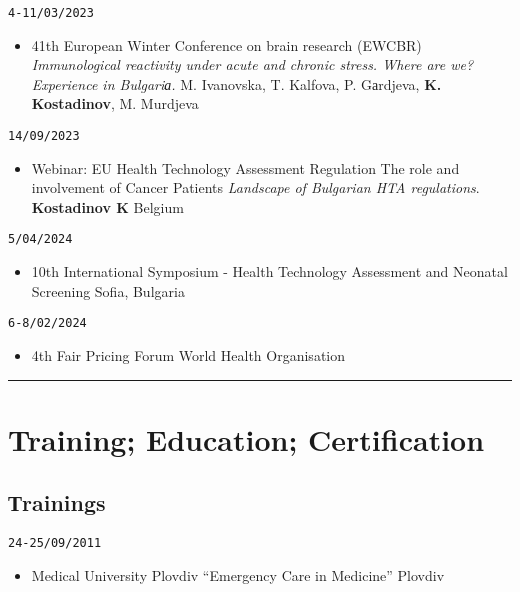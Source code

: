 \documentclass[
  12pt,
  letterpaper,
  DIV=11,
  numbers=noendperiod]{scrartcl}
\providecommand{\tightlist}{%
  \setlength{\itemsep}{0pt}\setlength{\parskip}{0pt}}\usepackage{longtable,booktabs,array}
\begin{document}
\texttt{4-11/03/2023}

\begin{itemize}
\tightlist
\item
  41th European Winter Conference on brain research (EWCBR) \textbar{}
  \emph{Immunological reactivity under acute and chronic stress. Where
  are we? Experience in Bulgariа.} \textbar{} M. Ivanovska, T. Kalfova,
  P. Gаrdjeva, \textbf{K. Kostadinov}, M. Murdjeva
\end{itemize}

\texttt{14/09/2023}

\begin{itemize}
\tightlist
\item
  Webinar: EU Health Technology Assessment Regulation \textbar{} The
  role and involvement of Cancer Patients \textbar{} \emph{Landscape of
  Bulgarian HTA regulations}. \textbar{} \textbf{Kostadinov K}
  \textbar{} Belgium
\end{itemize}

\texttt{5/04/2024}

\begin{itemize}
\tightlist
\item
  10th International Symposium - Health Technology Assessment and
  Neonatal Screening \textbar{} Sofia, Bulgaria
\end{itemize}

\texttt{6-8/02/2024}

\begin{itemize}
\tightlist
\item
  4th Fair Pricing Forum \textbar{} World Health Organisation
\end{itemize}

\begin{center}\rule{0.5\linewidth}{0.5pt}\end{center}

\section{Training; Education;
Certification}\label{training-education-certification}

\subsection{Тrainings}\label{ux442rainings}

\texttt{24-25/09/2011}

\begin{itemize}
\tightlist
\item
  Medical University Plovdiv \textbar{} ``Emergency Care in Medicine''
  \textbar{} Plovdiv
\end{itemize}
\end{document}
